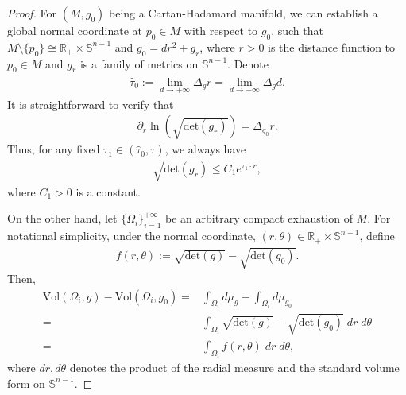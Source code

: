\documentclass[12pt]{amsart}
\begin{document}
\begin{proof}
    For $(M, g_0)$ being a Cartan-Hadamard manifold, we can establish a global normal coordinate at $p_0\in M$ with respect to $g_0$, such that $M\setminus\{p_0\} \cong \mathbb{R}_+ \times \mathbb{S}^{n - 1}$ and $g_0 = dr^2 + g_r$, where $r > 0$ is the distance function to $p_0\in M$ and $g_r$ is a family of metrics on $\mathbb{S}^{n - 1}$. Denote 
    \begin{align*}
        \hat{\tau}_0 := \overline{\lim_{d\rightarrow+\infty}}\Delta_g r = \overline{\lim_{d\rightarrow+\infty}} \Delta_g d. 
    \end{align*}
    It is straightforward to verify that
    \begin{align*}
        \partial_r \ln \left( \sqrt{\mathrm{det}(g_r)} \right) = \Delta_{g_0} r.
    \end{align*}
    Thus, for any fixed $\tau_1\in (\hat{\tau}_0, \tau)$, we always have
    \begin{align}\label{sphere area blow up}
        \sqrt{\mathrm{det} (g_r)} \leq C_1 e^{\tau_1 \cdot r},
    \end{align}
    where $C_1 > 0$ is a constant.
    
    On the other hand, let $\{\Omega_i\}_{i=1}^{+\infty}$ be an arbitrary compact exhaustion of $M$. For notational simplicity, under the normal coordinate, $(r, \theta)\in \mathbb{R}_{+} \times \mathbb{S}^{n - 1}$, define 
    \begin{align*}
        f(r, \theta) := \sqrt{\mathrm{det}(g)} - \sqrt{\mathrm{det}(g_0)}. 
    \end{align*}
    Then, 
    \begin{align*}
        \mathrm{Vol}(\Omega_i, g) - \mathrm{Vol}(\Omega_i, g_0) =& \int_{\Omega_i}d\mu_g - \int_{\Omega_i}d\mu_{g_0}\\ 
        =& \int_{\Omega_i} \sqrt{\mathrm{det}(g)} - \sqrt{\mathrm{det}(g_0)}\;dr\;d\theta\\
        =& \int_{\Omega_i} f(r, \theta)\; dr\; d\theta,
    \end{align*}
    where $dr,d\theta$ denotes the product of the radial measure and the standard volume form on $\mathbb{S}^{n-1}$.
    

\end{proof}
\end{document}
